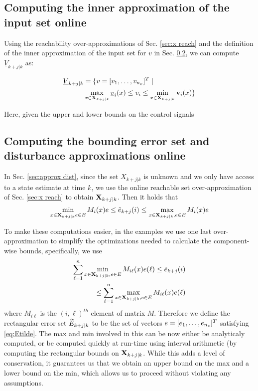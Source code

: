 \subsection{Computing the inner approximation of the input set online}

Using the reachability over-approximations of Sec. \ref{sec:x reach} and the definition of the inner approximation of the input set for $v$ in Sec. \ref{}, we can compute $\underline{V}_{k+j|k}$ as:

\begin{subequations}
\begin{align}
\underline{V}_{k+j|k} &= \{v=[v_1,\ldots,v_{n_v}]^T \;|\; \nonumber \\
&\max_{x\in \mathbf{X}_{k+j|k}} \underline{v}_i(x)  \leq v_i \leq \min_{x \in \mathbf{X}_{k+j|k}} \mathbf{v}_i(x) \} 
\end{align}
\end{subequations}

Here, given the upper and lower bounds on the control signals



\subsection{Computing the bounding error set and disturbance approximations online}

In Sec. \ref{sec:approx dist}, since the set $X_{k+j|k}$ is unknown and we only have access to a state estimate at time $k$, we use the online reachable set over-approximation of Sec. \ref{sec:x reach} to obtain $\mathbf{X}_{k+j|k}$.
Then it holds that 
\[\min_{x \in \mathbf{X}_{k+j|k} e \in E}M_i(x)e \leq \tilde{e}_{k+j}(i) \leq \max_{x \in \mathbf{X}_{k+j|k}, e \in E} M_i(x)e\]

To make these computations easier, in the examples we use one last over-approximation to simplify the optimizations needed to calculate the component-wise bounds, specifically, we use 
\begin{eqnarray}
\label{eq:Etilde}
\sum_{\ell=1}^{n} \min_{x \in \mathbf{X}_{k+j|k}, e \in E} M_{i\ell}(x)e(\ell)  \leq \tilde{e}_{k+j}(i) 
\nonumber 
\\
\leq \sum_{\ell=1}^{n} \max_{x \in \mathbf{X}_{k+j|k}, e \in E} M_{i\ell}(x)e(\ell)
\end{eqnarray}
where $M_{i\ell}$ is the $(i,\ell)^{th}$ element of matrix $M$.
Therefore we define the rectangular error set $\widetilde{E}_{k+j|k}$ to be the set of vectors $e = [e_1,\ldots, e_{n_z}]^T$ satisfying \eqref{eq:Etilde}. The max and min involved in this can be now either be analyticaly computed, or be computed quickly at run-time using interval arithmetic (by computing the rectangular bounds on $\mathbf{X}_{k+j|k}$. While this adds a level of conservation, it guarantees us that we obtain an upper bound on the max and a lower bound on the min, which allows us to proceed without violating any assumptions.

